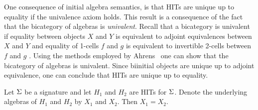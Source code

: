 One consequence of initial algebra semantics, is that HITs are unique up to equality if the univalence axiom holds.
This result is a consequence of the fact that the bicategory of algebras is \emph{univalent}.
Recall that a bicategory is univalent if
equality between objects $X$ and $Y$ is equivalent to adjoint equivalences between $X$ and $Y$
and equality of 1-cells $f$ and $g$ is equivalent to invertible 2-cells between $f$ and $g$
\cite{bicatjournal}.
Using the methods employed by Ahrens \etal \ one can show that the bicategory of algebras
is univalent.
Since biinitial objects are unique up to adjoint equivalence, one can conclude that HITs are unique up
to equality.

\begin{proposition}
Let $\Sigma$ be a signature and let $H_1$ and $H_2$ are HITs for $\Sigma$.
Denote the underlying algebras of $H_1$ and $H_2$ by $X_1$ and $X_2$.
Then $X_1 = X_2$.
\end{proposition}
